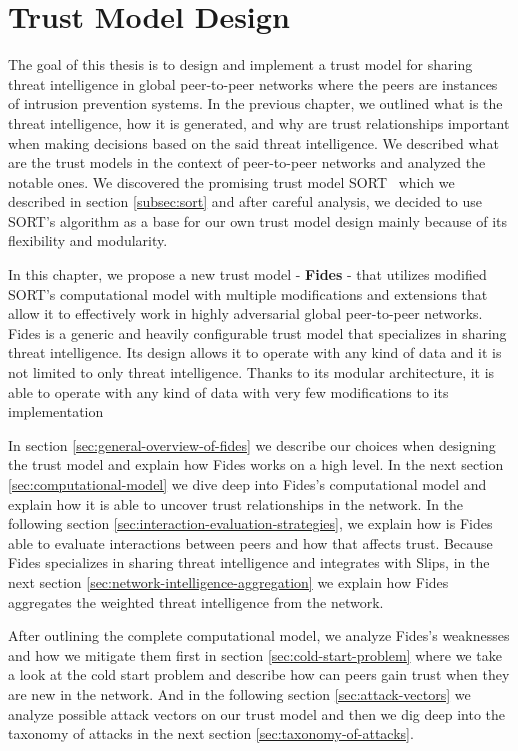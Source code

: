 \chapter{Trust Model Design}
\label{ch:trust-model-design}
The goal of this thesis is to design and implement a trust model for sharing threat intelligence in global peer-to-peer networks where the peers are instances of intrusion prevention systems.
In the previous chapter, we outlined what is the threat intelligence, how it is generated, and why are trust relationships important when making decisions based on the said threat intelligence.
We described what are the trust models in the context of peer-to-peer networks and analyzed the notable ones.
We discovered the promising trust model SORT~\cite{sort} which we described in section \ref{subsec:sort} and after careful analysis, we decided to use SORT's algorithm as a base for our own trust model design mainly because of its flexibility and modularity.

In this chapter, we propose a new trust model - \textbf{Fides} - that utilizes modified SORT's computational model with multiple modifications and extensions that allow it to effectively work in highly adversarial global peer-to-peer networks.
Fides is a generic and heavily configurable trust model that specializes in sharing threat intelligence.
Its design allows it to operate with any kind of data and it is not limited to only threat intelligence. 
Thanks to its modular architecture, it is able to operate with any kind of data with very few modifications to its implementation

In section \ref{sec:general-overview-of-fides} we describe our choices when designing the trust model and explain how Fides works on a high level.
In the next section \ref{sec:computational-model} we dive deep into Fides's computational model and explain how it is able to uncover trust relationships in the network.
In the following section \ref{sec:interaction-evaluation-strategies}, we explain how is Fides able to evaluate interactions between peers and how that affects trust.
Because Fides specializes in sharing threat intelligence and integrates with Slips, in the next section \ref{sec:network-intelligence-aggregation} we explain how Fides aggregates the weighted threat intelligence from the network.

After outlining the complete computational model, we analyze Fides's weaknesses and how we mitigate them first in section \ref{sec:cold-start-problem} where we take a look at the cold start problem and describe how can peers gain trust when they are new in the network.
And in the following section \ref{sec:attack-vectors} we analyze possible attack vectors on our trust model and then we dig deep into the taxonomy of attacks in the next section \ref{sec:taxonomy-of-attacks}.

